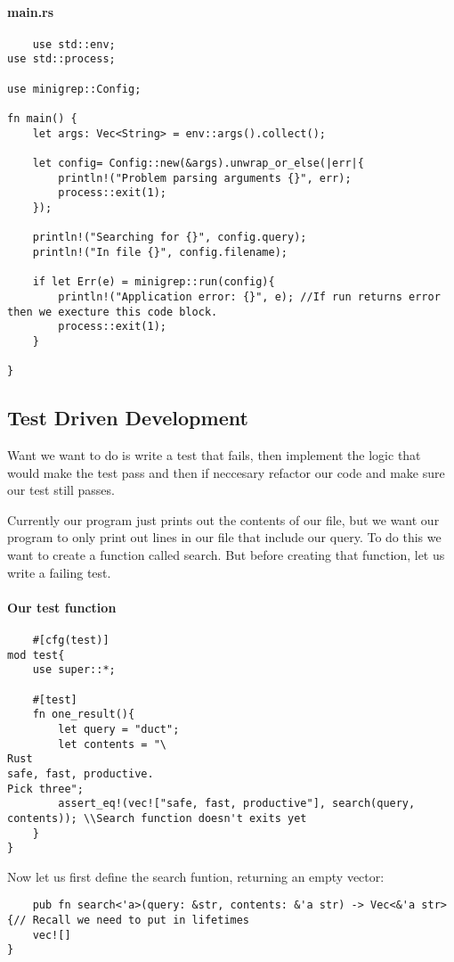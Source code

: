 \paragraph*{main.rs}\begin{lstlisting}
    use std::env;
use std::process;

use minigrep::Config;

fn main() {
    let args: Vec<String> = env::args().collect(); 
    
    let config= Config::new(&args).unwrap_or_else(|err|{
        println!("Problem parsing arguments {}", err);
        process::exit(1);
    });

    println!("Searching for {}", config.query);
    println!("In file {}", config.filename);

    if let Err(e) = minigrep::run(config){
        println!("Application error: {}", e); //If run returns error then we execture this code block.
        process::exit(1);
    }

}
\end{lstlisting}

\subsection{Test Driven Development}
Want we want to do is write a test that fails, then implement the logic that would make the test pass and then if neccesary refactor our code and make sure our test still passes.

Currently our program just prints out the contents of our file, but we want our program to only print out lines in our file that include our query. To do this we want to create a function called search. But before creating that function, let us write a failing test.
\paragraph*{Our test function}\begin{lstlisting}
    #[cfg(test)]
mod test{
    use super::*;

    #[test]
    fn one_result(){
        let query = "duct";
        let contents = "\
Rust
safe, fast, productive.
Pick three";
        assert_eq!(vec!["safe, fast, productive"], search(query, contents)); \\Search function doesn't exits yet
    }
}
\end{lstlisting}

Now let us first define the search funtion, returning an empty vector:\begin{lstlisting}
    pub fn search<'a>(query: &str, contents: &'a str) -> Vec<&'a str>{// Recall we need to put in lifetimes
    vec![]
}
\end{lstlisting}

